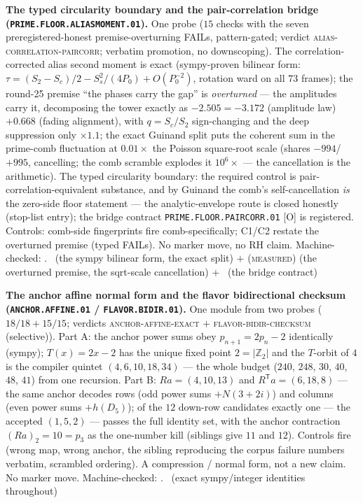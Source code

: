 \documentclass[11pt,a4paper]{article}
\newcommand{\Z}{\mathbb{Z}}
\theoremstyle{definition}
\begin{document}
\par\smallskip\noindent\textbf{The typed circularity boundary and
the pair-correlation bridge (\texttt{PRIME.FLOOR.ALIASMOMENT.01}).}
One probe ($15$ checks with the seven preregistered-honest
premise-overturning FAILs, pattern-gated; verdict
\textsc{alias-correlation-paircorr}; verbatim promotion, no
downscoping).  The correlation-corrected alias second moment is
exact (sympy-proven bilinear form: $\tau = (S_2 - S_c)/2 -
S_s^2/(4P_0) + O(P_0^{-2})$, rotation ward on all $73$ frames);
the round-25 premise ``the phases carry the gap'' is
\emph{overturned} --- the amplitudes carry it, decomposing the
tower exactly as $-2.505 = -3.172$ (amplitude law) $+ 0.668$
(fading alignment), with $q = S_c/S_2$ sign-changing and the deep
suppression only $\times1.1$; the exact Guinand split puts the
coherent sum in the prime-comb fluctuation at $0.01\times$ the
Poisson square-root scale (shares $-994$/$+995$, cancelling; the
comb scramble explodes it $10^6\times$ --- the cancellation is
the arithmetic).  The typed circularity boundary: the required
control is pair-correlation-equivalent substance, and by Guinand
the comb's self-cancellation \emph{is} the zero-side floor
statement --- the analytic-envelope route is closed honestly
(stop-list entry); the bridge contract
\texttt{PRIME.FLOOR.PAIRCORR.01} [O] is registered.  Controls:
comb-side fingerprints fire comb-specifically; C1/C2 restate the
overturned premise (typed FAILs).  No marker move, no RH claim.
Machine-checked: .
\mE\ (the sympy bilinear form, the exact split) $+$
(\textsc{measured}) (the overturned premise, the sqrt-scale
cancellation) $+$ \mO\ (the bridge contract)
\par\smallskip

\par\smallskip\noindent\textbf{The anchor affine normal form and
the flavor bidirectional checksum (\texttt{ANCHOR.AFFINE.01} /
\texttt{FLAVOR.BIDIR.01}).}
One module from two probes ($18/18 + 15/15$; verdicts
\textsc{anchor-affine-exact} $+$ \textsc{flavor-bidir-checksum}
(selective)).  Part A: the anchor power sums obey
$p_{n+1} = 2p_n - 2$ identically (sympy); $T(x) = 2x - 2$ has the
unique fixed point $2 = |\Z_2|$ and the $T$-orbit of $4$ is the
compiler quintet $(4, 6, 10, 18, 34)$ --- the whole budget
($240$, $248$, $30$, $40$, $48$, $41$) from one recursion.  Part
B: $Ra = (4, 10, 13)$ and $R^{\mathsf T}a = (6, 18, 8)$ --- the
same anchor decodes rows (odd power sums $+ N(3{+}2i)$) and
columns (even power sums $+ h(D_5)$); of the $12$ down-row
candidates exactly one --- the accepted $(1,5,2)$ --- passes the
full identity set, with the anchor contraction $(Ra)_2 = 10 =
p_3$ as the one-number kill (siblings give $11$ and $12$).
Controls fire (wrong map, wrong anchor, the sibling reproducing
the corpus failure numbers verbatim, scrambled ordering).  A
compression / normal form, not a new claim.  No marker move.
Machine-checked: .
\mE\ (exact sympy/integer identities throughout)
\par\smallskip
\end{document}

